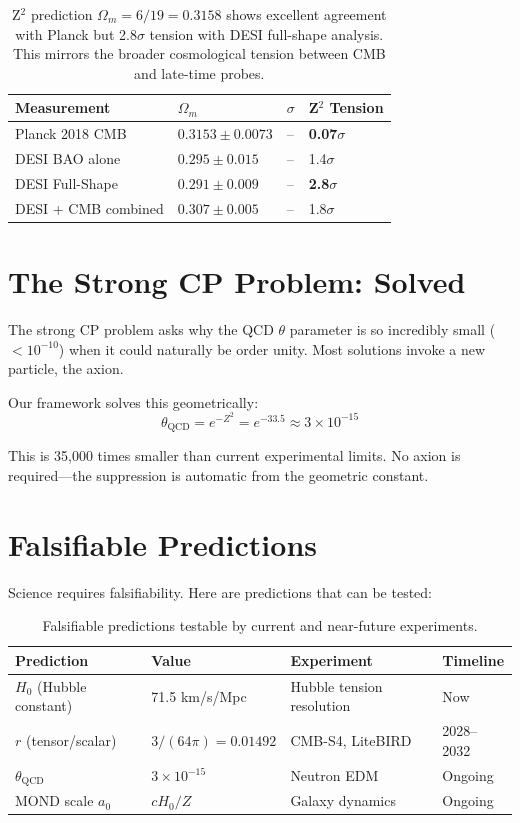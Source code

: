 \documentclass[11pt,a4paper]{article}
\theoremstyle{plain}
\theoremstyle{definition}
\theoremstyle{remark}
\begin{document}
\begin{table}[h!]
\centering
\begin{tabular}{llll}
\toprule
\textbf{Measurement} & $\Omega_m$ & $\sigma$ & \textbf{Z$^2$ Tension} \\
\midrule
Planck 2018 CMB & $0.3153 \pm 0.0073$ & -- & \textbf{0.07$\sigma$} \\
DESI BAO alone & $0.295 \pm 0.015$ & -- & 1.4$\sigma$ \\
DESI Full-Shape & $0.291 \pm 0.009$ & -- & \textbf{2.8$\sigma$} \\
DESI + CMB combined & $0.307 \pm 0.005$ & -- & 1.8$\sigma$ \\
\bottomrule
\end{tabular}
\caption{Z$^2$ prediction $\Omega_m = 6/19 = 0.3158$ shows excellent agreement with Planck but 2.8$\sigma$ tension with DESI full-shape analysis. This mirrors the broader cosmological tension between CMB and late-time probes.}
\end{table}

\section{The Strong CP Problem: Solved}

The strong CP problem asks why the QCD $\theta$ parameter is so incredibly small ($<10^{-10}$) when it could naturally be order unity. Most solutions invoke a new particle, the axion.

Our framework solves this geometrically:
\[
\theta_{\text{QCD}} = e^{-Z^2} = e^{-33.5} \approx 3 \times 10^{-15}
\]

This is 35,000 times smaller than current experimental limits. No axion is required---the suppression is automatic from the geometric constant.

\section{Falsifiable Predictions}
\label{sec:predictions}

Science requires falsifiability. Here are predictions that can be tested:

\begin{table}[h!]
\centering
\begin{tabular}{llll}
\toprule
\textbf{Prediction} & \textbf{Value} & \textbf{Experiment} & \textbf{Timeline} \\
\midrule
$H_0$ (Hubble constant) & 71.5 km/s/Mpc & Hubble tension resolution & Now \\
$r$ (tensor/scalar) & $3/(64\pi) = 0.01492$ & CMB-S4, LiteBIRD & 2028--2032 \\
$\theta_{\text{QCD}}$ & $3 \times 10^{-15}$ & Neutron EDM & Ongoing \\
MOND scale $a_0$ & $cH_0/Z$ & Galaxy dynamics & Ongoing \\
\bottomrule
\end{tabular}
\caption{Falsifiable predictions testable by current and near-future experiments.}
\end{table}
\end{document}
